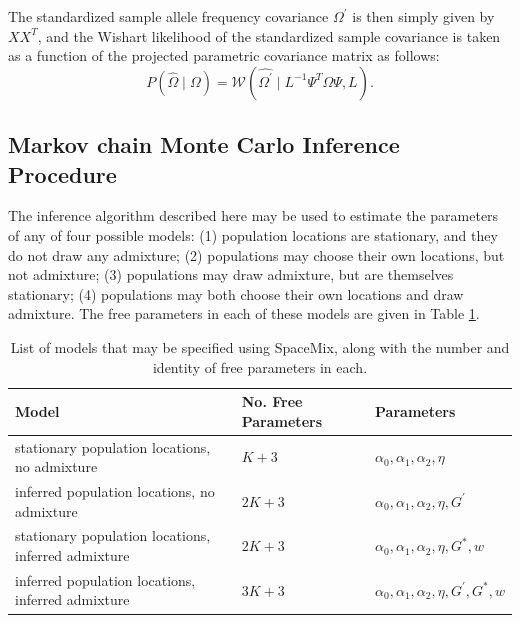 \documentclass[12pt]{article}
\newcommand{\identifyadmixsource}[1]{{#1^{*}}}
\begin{document}
%
The standardized sample allele frequency covariance $\Omega^{\prime}$ is then simply given by $XX^{T}$, and the Wishart likelihood of the standardized sample covariance is taken as a function of the projected parametric covariance matrix as follows:
%
\begin{equation}
\label{eq:projected_wishart_dist}
P(\widehat{\Omega} \mid \Omega) = \mathcal{W}\left(\widehat{\Omega^{\prime}} \mid L^{-1} \Psi^{T}   \Omega   \Psi,L \right) \text{.}
\end{equation}
%

\subsection*{Markov chain Monte Carlo Inference Procedure}
The inference algorithm described here may be used to estimate the parameters of any of four possible models: (1) population locations are stationary, and they do not draw any admixture; (2) populations may choose their own locations, but not admixture; (3) populations may draw admixture, but are themselves stationary; (4) populations may both choose their own locations and draw admixture.  The free parameters in each of these models are given in Table \ref{tab:model_options}.

\begin{centering}
\begin{table}
\begin{tabular}{| >{\centering\arraybackslash}m{6cm} | >{\centering\arraybackslash}m{3cm} | l |}
	\hline
	\textbf{Model} & \textbf{No. Free Parameters} & \textbf{Parameters}\\ \hline
	stationary population locations, no admixture & $K + 3$	& $\alpha_0,\alpha_1,\alpha_2,\eta$	\\ \hline
	inferred population locations, \hspace{0.5cm}no admixture & $2K + 3$	& $\alpha_0,\alpha_1,\alpha_2,\eta,G^{\prime}$	\\ \hline
	stationary population locations, inferred admixture & $2K + 3$	& $\alpha_0,\alpha_1,\alpha_2,\eta,\identifyadmixsource{G},w$	\\ \hline
	inferred population locations, inferred admixture & $3K + 3$	&$\alpha_0,\alpha_1,\alpha_2,\eta,G^{\prime},\identifyadmixsource{G},w$	\\
	\hline
\end{tabular}
\caption{List of models that may be specified using SpaceMix, along with the number and identity of free parameters in each.}\label{tab:model_options}
\end{table}
\end{centering}
\end{document}
